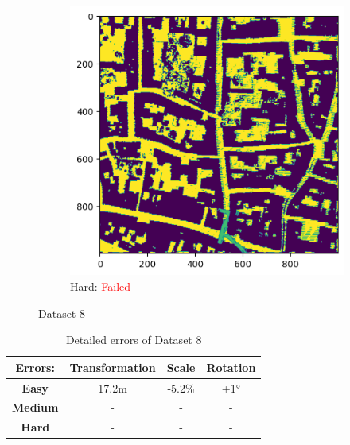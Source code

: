 \documentclass[11pt]{article}
\begin{document}
\begin{figure}[p]
        \vspace{1em}

        \begin{subfigure}{0.45\textwidth}
            \centering
            \includegraphics[width=\linewidth]{images/full/hard/5_7_2_hard}
            \caption{Hard: \textcolor{red}{Failed}}
            \label{fig:5_7_2_hard}
        \end{subfigure}
        \hfill

        \caption{Dataset 8}
        \label{fig:res_5_7_2}
    \end{figure}

    \begin{table}[p]
        \centering
        \begin{tabular}{|c|c|c|c|}
          \hline
          \textbf{Errors:} & \textbf{Transformation} & \textbf{Scale} & \textbf{Rotation} \\
          \hline
          \textbf{Easy}   & 17.2m  & -5.2\% & +1° \\
          \hline
          \textbf{Medium} & -  & - & - \\
          \hline
          \textbf{Hard}   & -  & - & - \\
          \hline
        \end{tabular}
        \caption{Detailed errors of Dataset 8}
        \label{tab:simpletable}
    \end{table}
\end{document}
